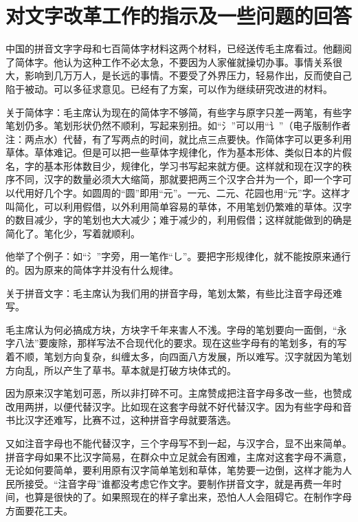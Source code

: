 \section[对文字改革工作的指示及一些问题的回答（一九五三年一月二十六日）]{对文字改革工作的指示及一些问题的回答}


中国的拼音文字字母和七百简体字材料这两个材料，已经送传毛主席看过。他翻阅了简体字。他认为这种工作不必太急，不要因为人家催就操切办事。事情关系很大，影响到几万万人，是长远的事情。不要受了外界压力，轻易作出，反而使自己陷于被动。可以多征求意见。已经有了方案，可以作为继续研究改进的材料。

关于简体字：毛主席认为现在的简体字不够简，有些字与原字只差一两笔，有些字笔划仍多。笔划形状仍然不顺利，写起来别扭。如“氵”可以用“讠”（电子版制作者注：两点水）代替，有了写两点的时间，就比点三点要快。作简体字可以更多利用草体。草体难记。但是可以把一些草体字规律化，作为基本形体、类似日本的片假名，字的基本形体数目少，规律化，学习书写起来就方便。这样就和现在汉字的秩序不同，汉字的数量必须大大缩简，那就要把两三个汉字合并为一个，即一个字可以代用好几个字。如圆周的“圆”即用“元”。一元、二元、花园也用“元”字。这样才叫简化，可以利用假借，以外利用简单容易的草体，不用笔划仍繁难的草体。汉字的数目减少，字的笔划也大大减少；难于减少的，利用假借；这样就能做到的确是简化了。笔化少，写着就顺利。

他举了个例子：如“氵”字旁，用一笔作“し”。要把字形规律化，就不能按原来通行的。因为原来的简体字并没有什么规律。

关于拼音文字：毛主席认为我们用的拼音字母，笔划太繁，有些比注音字母还难写。

毛主席认为何必搞成方块，方块字千年来害人不浅。字母的笔划要向一面倒，“永字八法”要废除，那样写法不合现代化的要求。现在这些字母有的笔划多，有的写着不顺，笔划方向复杂，纠缠太多，向四面八方发展，所以难写。汉字就因为笔划方向乱，所以产生了草书。草本就是打破方块体式的。

因为原来汉字笔划可恶，所以非打碎不可。主席赞成把注音字母多改一些，也赞成改用两拼，以便代替汉字。比如现在这套字母就不好代替汉字。因为有些字母和音书比汉字还难写，比赛不过，这种拼音字母就要落选。

又如注音字母也不能代替汉字，三个字母写不到一起，与汉字合，显不出来简单。拼音字母如果不比汉字简易，在群众中立足就会有困难，主席对这套字母不满意，无论如何要简单，要利用原有汉字简单笔划和草体，笔势要一边倒，这样才能为人民所接受。“注音字母”谁都没考虑它作文字。要制作拼音文字，就是再费一年时间，也算是很快的了。如果照现在的样子拿出来，恐怕人人会阻碍它。在制作字母方面要花工夫。

